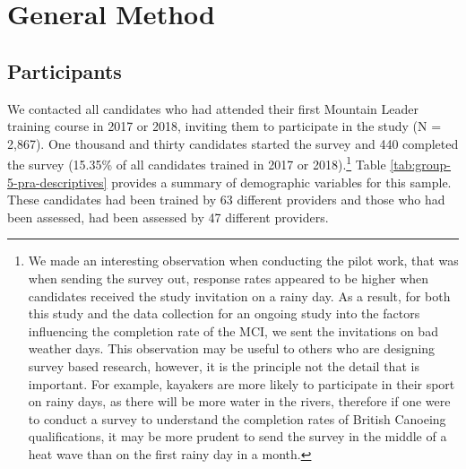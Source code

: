 \documentclass[
  12pt,
  a4paper,
]{book}
\begin{document}
\hypertarget{pra-general-method}{%
\section{General Method}\label{pra-general-method}}

\hypertarget{pra-participants}{%
\subsection{Participants}\label{pra-participants}}

We contacted all candidates who had attended their first Mountain Leader training course in 2017 or 2018, inviting them to participate in the study (N = 2,867). One thousand and thirty candidates started the survey and 440 completed the survey (15.35\% of all candidates trained in 2017 or 2018).\footnote{We made an interesting observation when conducting the pilot work, that was when sending the survey out, response rates appeared to be higher when candidates received the study invitation on a rainy day. As a result, for both this study and the data collection for an ongoing study into the factors influencing the completion rate of the MCI, we sent the invitations on bad weather days. This observation may be useful to others who are designing survey based research, however, it is the principle not the detail that is important. For example, kayakers are more likely to participate in their sport on rainy days, as there will be more water in the rivers, therefore if one were to conduct a survey to understand the completion rates of British Canoeing qualifications, it may be more prudent to send the survey in the middle of a heat wave than on the first rainy day in a month.} Table \ref{tab:group-5-pra-descriptives} provides a summary of demographic variables for this sample. These candidates had been trained by 63 different providers and those who had been assessed, had been assessed by 47 different providers.
\end{document}
